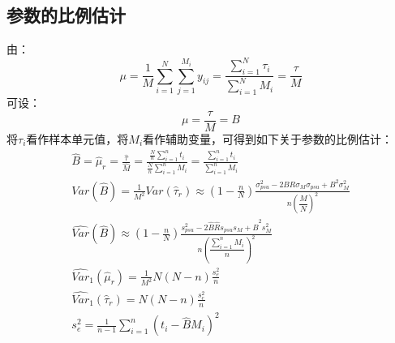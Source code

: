 \subsection{参数的比例估计}
由：
\begin{equation*}
	\mu=\frac{1}{M}\sum_{i=1}^{N}\sum_{j=1}^{M_i}y_{ij}=\frac{\sum\limits_{i=1}^{N}\tau_i}{\sum\limits_{i=1}^{N}M_i}=\frac{\tau}{M}
\end{equation*}
可设：
\begin{equation*}
	\mu=\frac{\tau}{M}=B
\end{equation*}
将$\tau_i$看作样本单元值，将$M_i$看作辅助变量，可得到如下关于参数的比例估计：
\begin{gather*}
	\hat{B}=\hat{\mu}_r=\frac{\hat{\tau}}{\hat{M}}=\frac{\frac{N}{n}\sum_{i=1}^nt_i}{\frac{N}{n}\sum_{i=1}^nM_i}=\frac{\sum_{i=1}^{n}t_i}{\sum_{i=1}^{n}M_i} \\
	Var(\hat{B})=\frac{1}{M^2}Var(\hat{\tau}_r)\approx\left(1-\frac{n}{N}\right)\frac{\sigma_{psu}^2-2BR\sigma_{M}\sigma_{psu}+B^2\sigma_{M}^2}{n(\dfrac{M}{N})^2} \\
	\widehat{Var}(\hat{B})\approx\left(1-\frac{n}{N}\right)\frac{s_{psu}^2-2\hat{B}\hat{R}s_{psu}s_M+\hat{B}^2s_M^2}{n(\dfrac{\sum_{i=1}^{n}M_i}{n})^2} \\
	\widehat{Var}_1(\hat{\mu}_r)=\frac{1}{M^2}N\left(N-n\right)\frac{s_e^2}{n} \\
	\widehat{Var}_1(\hat{\tau}_r)=N\left(N-n\right)\frac{s_e^2}{n} \\
	s_e^2=\frac{1}{n-1}\sum_{i=1}^{n}\left(t_i-\hat{B}M_i\right)^2
\end{gather*}
